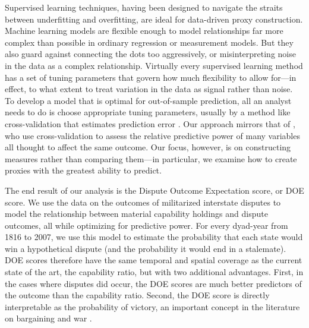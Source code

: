 Supervised learning techniques, having been designed to navigate the straits between underfitting and overfitting, are ideal for data-driven proxy construction.
Machine learning models are flexible enough to model relationships far more complex than possible in ordinary regression or measurement models.
But they also guard against connecting the dots too aggressively, or misinterpreting noise in the data as a complex relationship.
Virtually every supervised learning method has a set of tuning parameters that govern how much flexibility to allow for---in effect, to what extent to treat variation in the data as signal rather than noise.
To develop a model that is optimal for out-of-sample prediction, all an analyst needs to do is choose appropriate tuning parameters, usually by a method like cross-validation that estimates prediction error \citep{Efron:2012es}.
Our approach mirrors that of \citet{Hill:2014ki}, who use cross-validation to assess the relative predictive power of many variables all thought to affect the same outcome.
Our focus, however, is on constructing measures rather than comparing them---in particular, we examine how to create proxies with the greatest ability to predict.

The end result of our analysis is the Dispute Outcome Expectation score, or DOE score.
We use the data on the outcomes of militarized interstate disputes \citep{Palmer:2015hp} to model the relationship between material capability holdings and dispute outcomes, all while optimizing for predictive power.
For every dyad-year from 1816 to 2007, we use this model to estimate the probability that each state would win a hypothetical dispute (and the probability it would end in a stalemate).
DOE scores therefore have the same temporal and spatial coverage as the current state of the art, the capability ratio, but with two additional advantages.
First, in the cases where disputes did occur, the DOE scores are much better predictors of the outcome than the capability ratio.
Second, the DOE score is directly interpretable as the probability of victory, an important concept in the literature on bargaining and war \citep{fearon1995,powell1996stability}.

